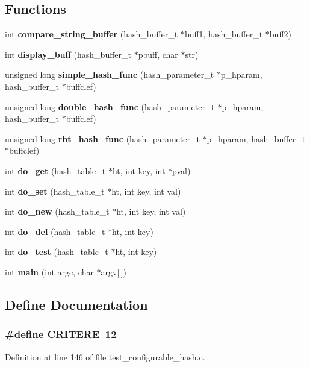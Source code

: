 \subsection*{Functions}
\begin{CompactItemize}
\item 
int {\bf compare\_\-string\_\-buffer} (hash\_\-buffer\_\-t $\ast$buff1, hash\_\-buffer\_\-t $\ast$buff2)
\item 
int {\bf display\_\-buff} (hash\_\-buffer\_\-t $\ast$pbuff, char $\ast$str)
\item 
unsigned long {\bf simple\_\-hash\_\-func} (hash\_\-parameter\_\-t $\ast$p\_\-hparam, hash\_\-buffer\_\-t $\ast$buffclef)
\item 
unsigned long {\bf double\_\-hash\_\-func} (hash\_\-parameter\_\-t $\ast$p\_\-hparam, hash\_\-buffer\_\-t $\ast$buffclef)
\item 
unsigned long {\bf rbt\_\-hash\_\-func} (hash\_\-parameter\_\-t $\ast$p\_\-hparam, hash\_\-buffer\_\-t $\ast$buffclef)
\item 
int {\bf do\_\-get} (hash\_\-table\_\-t $\ast$ht, int key, int $\ast$pval)
\item 
int {\bf do\_\-set} (hash\_\-table\_\-t $\ast$ht, int key, int val)
\item 
int {\bf do\_\-new} (hash\_\-table\_\-t $\ast$ht, int key, int val)
\item 
int {\bf do\_\-del} (hash\_\-table\_\-t $\ast$ht, int key)
\item 
int {\bf do\_\-test} (hash\_\-table\_\-t $\ast$ht, int key)
\item 
int {\bf main} (int argc, char $\ast$argv[$\,$])
\end{CompactItemize}


\subsection{Define Documentation}
\subsubsection{\setlength{\rightskip}{0pt plus 5cm}\#define CRITERE\ 12}\label{test__configurable__hash_8c_a7}




Definition at line 146 of file test\_\-configurable\_\-hash.c.
